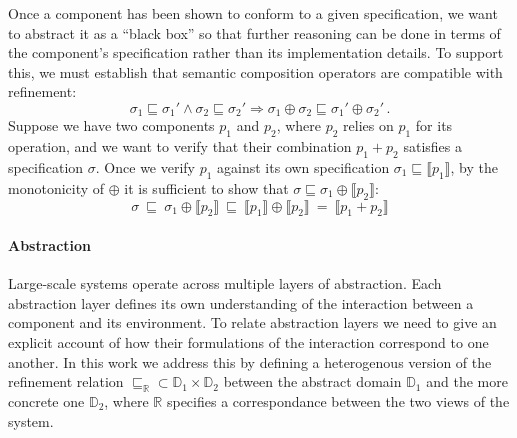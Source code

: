 \documentclass[sigplan,10pt,review,anonymous]{acmart}\settopmatter{printfolios=true,printccs=false,printacmref=false}
\begin{document}
Once a component has been shown to conform to a given specification,
we want to abstract it as a ``black box''
so that further reasoning can be done in terms of
the component's specification rather than its implementation details.
To support this,
we must establish that semantic composition operators
are compatible with refinement:
\[ \sigma_1 \sqsubseteq \sigma_1' \wedge
   \sigma_2 \sqsubseteq \sigma_2' \Rightarrow
   \sigma_1 \oplus \sigma_2 \sqsubseteq \sigma_1' \oplus \sigma_2' \,. \]
Suppose we have two components $p_1$ and $p_2$,
where $p_2$ relies on $p_1$ for its operation,
and we want to verify that their combination $p_1 + p_2$
satisfies a specification $\sigma$.
Once we verify $p_1$ against its own specification
$\sigma_1 \sqsubseteq \llbracket p_1 \rrbracket$,
by the monotonicity of ${\oplus}$ it is sufficient to show that
$\sigma \sqsubseteq \sigma_1 \oplus \llbracket p_2 \rrbracket$:
\[
   \sigma \:\sqsubseteq\:
   \sigma_1 \oplus \llbracket p_2 \rrbracket \:\sqsubseteq\:
   \llbracket p_1 \rrbracket \oplus \llbracket p_2 \rrbracket \:=\:
   \llbracket p_1 + p_2 \rrbracket
\]


\paragraph{Abstraction} %

Large-scale systems operate across multiple layers of abstraction.
Each abstraction layer defines its own understanding of the interaction
between a component and its environment.
To relate abstraction layers we need to give
an explicit account of how their formulations of the interaction
correspond to one another.
In this work we address this by defining a heterogenous version
of the refinement relation
${\sqsubseteq_\mathbb{R}} \subset
 \mathbb{D}_1 \times \mathbb{D}_2$ between
the abstract domain $\mathbb{D}_1$ and
the more concrete one $\mathbb{D}_2$, where
$\mathbb{R}$ specifies a correspondance between
the two views of the system.

\end{document}
